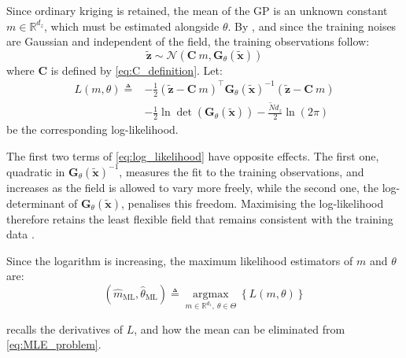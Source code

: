 Since ordinary kriging is retained, the mean of the GP is an unknown constant $m\in\mathbb{R}^{d_z}$, which must be estimated alongside $\theta$. By , and since the training noises are Gaussian and independent of the field, the training observations follow:
\begin{equation}
	\tilde{\mathbf{z}}\sim\mathcal{N}\left(\mathbf{C}\:m,\mathbf{G}_\theta(\tilde{\mathbf{x}})\right)
\end{equation}
where $\mathbf{C}$ is defined by \eqref{eq:C_definition}. Let:
\begin{equation}
	\begin{aligned}
	L(m,\theta)\triangleq&-\frac{1}{2}\left(\tilde{\mathbf{z}}-\mathbf{C}\:m\right)^\top \mathbf{G}_\theta(\tilde{\mathbf{x}})^{-1}\left(\tilde{\mathbf{z}}-\mathbf{C}\:m\right)\\
	&-\frac{1}{2}\ln\det\left(\mathbf{G}_\theta(\tilde{\mathbf{x}})\right)-\frac{\tilde{N}d_z}{2}\ln(2\pi)
	\end{aligned}\label{eq:log_likelihood}
\end{equation}
be the corresponding log-likelihood.

\begin{remark}
	The first two terms of \eqref{eq:log_likelihood} have opposite effects. The first one, quadratic in $\mathbf{G}_\theta(\tilde{\mathbf{x}})^{-1}$, measures the fit to the training observations, and increases as the field is allowed to vary more freely, while the second one, the log-determinant of $\mathbf{G}_\theta(\tilde{\mathbf{x}})$, penalises this freedom. Maximising the log-likelihood therefore retains the least flexible field that remains consistent with the training data \cite{bib:evidence}.
\end{remark}

Since the logarithm is increasing, the maximum likelihood estimators of $m$ and $\theta$ are:
\begin{equation}
	\left(\hat{m}_{\mathrm{ML}},\hat{\theta}_{\mathrm{ML}}\right)\triangleq\underset{m\in\mathbb{R}^{d_z},\:\theta\in\Theta}{\operatorname{argmax}}\left\{L(m,\theta)\right\}\label{eq:MLE_problem}
\end{equation}

 recalls the derivatives of $L$, and how the mean can be eliminated from \eqref{eq:MLE_problem}.

